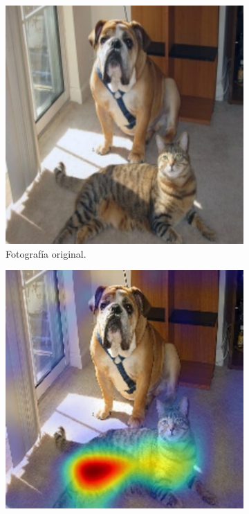 \begin{figure}[h]  
    \centering
    \begin{subfigure}{0.28\textwidth}
        \includegraphics[width=\textwidth]{figures/2_theory/grad_cam__og.jpg}
        \begin{minipage}{.1cm}
            \vfill
            \end{minipage}
        \caption{Fotografía original.}
        \label{fig__grad_cam__og}
    \end{subfigure}
    \begin{subfigure}{0.28\textwidth}
        \includegraphics[width=\textwidth]{figures/2_theory/grad_cam__cat.jpg}

\end{subfigure}
\end{figure}

